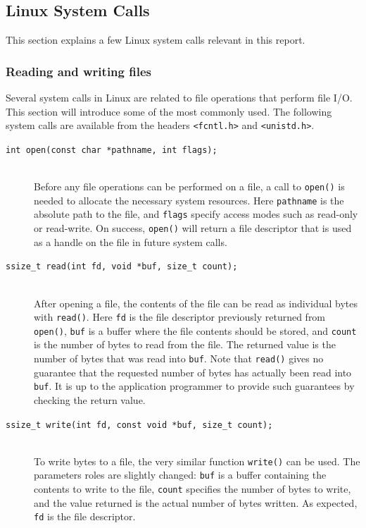 \subsection{Linux System Calls}
This section explains a few Linux system calls relevant in this report.

\subsubsection{Reading and writing files}\label{sec:reading-and-writing-files}
Several system calls in Linux are related to file operations that perform file I/O. This section will introduce some of the most commonly used. The following system calls are available from the headers \texttt{<fcntl.h>} and \texttt{<unistd.h>}.
\cite{linux-man-pages}

\begin{description}
\item[\texttt{int open(const char *pathname, int flags);}] \hfill \\
Before any file operations can be performed on a file, a call to \texttt{open()} is needed to allocate the necessary system resources. Here \texttt{pathname} is the absolute path to the file, and \texttt{flags} specify access modes such as read-only or read-write. On success, \texttt{open()} will return a file descriptor that is used as a handle on the file in future system calls.
\item[\texttt{ssize\_t read(int fd, void *buf, size\_t count);}] \hfill \\
After opening a file, the contents of the file can be read as individual bytes with \texttt{read()}. Here \texttt{fd} is the file descriptor previously returned from \texttt{open()}, \texttt{buf} is a buffer where the file contents should be stored, and \texttt{count} is the number of bytes to read from the file. The returned value is the number of bytes that was read into \texttt{buf}. Note that \texttt{read()} gives no guarantee that the requested number of bytes has actually been read into \texttt{buf}. It is up to the application programmer to provide such guarantees by checking the return value.
\item[\texttt{ssize\_t write(int fd, const void *buf, size\_t count);}] \hfill \\
To write bytes to a file, the very similar function \texttt{write()} can be used. The parameters roles are slightly changed: \texttt{buf} is a buffer containing the contents to write to the file, \texttt{count} specifies the number of bytes to write, and the value returned is the actual number of bytes written. As expected, \texttt{fd} is the file descriptor.

\end{description}
